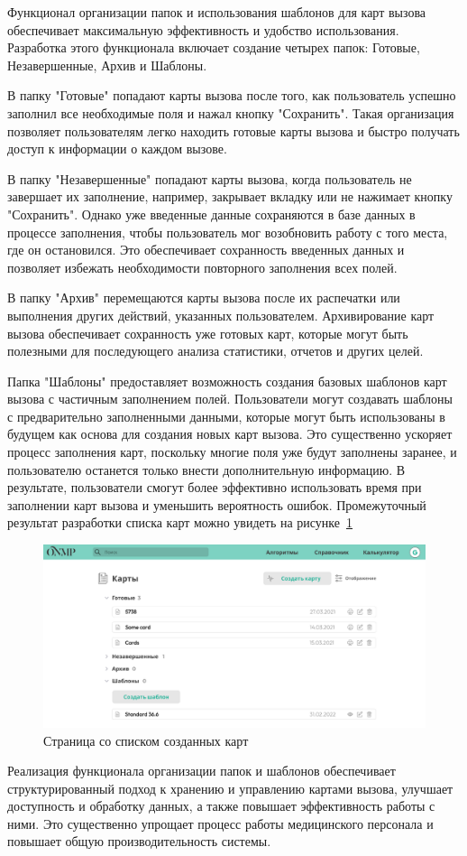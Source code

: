 Функционал организации папок и использования шаблонов для карт вызова обеспечивает максимальную эффективность и удобство использования. Разработка этого функционала включает создание четырех папок: Готовые, Незавершенные, Архив и Шаблоны.

В папку "Готовые" попадают карты вызова после того, как пользователь успешно заполнил все необходимые поля и нажал кнопку "Сохранить". Такая организация позволяет пользователям легко находить готовые карты вызова и быстро получать доступ к информации о каждом вызове.

В папку "Незавершенные" попадают карты вызова, когда пользователь не завершает их заполнение, например, закрывает вкладку или не нажимает кнопку "Сохранить". Однако уже введенные данные сохраняются в базе данных в процессе заполнения, чтобы пользователь мог возобновить работу с того места, где он остановился. Это обеспечивает сохранность введенных данных и позволяет избежать необходимости повторного заполнения всех полей.

В папку "Архив" перемещаются карты вызова после их распечатки или выполнения других действий, указанных пользователем. Архивирование карт вызова обеспечивает сохранность уже готовых карт, которые могут быть полезными для последующего анализа статистики, отчетов и других целей.

Папка "Шаблоны" предоставляет возможность создания базовых шаблонов карт вызова с частичным заполнением полей. Пользователи могут создавать шаблоны с предварительно заполненными данными, которые могут быть использованы в будущем как основа для создания новых карт вызова. Это существенно ускоряет процесс заполнения карт, поскольку многие поля уже будут заполнены заранее, и пользователю останется только внести дополнительную информацию. В результате, пользователи смогут более эффективно использовать время при заполнении карт вызова и уменьшить вероятность ошибок. Промежуточный результат разработки списка карт можно увидеть на рисунке~\ref{fig:result2}

\begin{figure}
  \includegraphics[scale=0.58]{styles/diploma/inc/result2.png}
  \caption{Страница со списком созданных карт}
  \label{fig:result2}
\end{figure}

Реализация функционала организации папок и шаблонов обеспечивает структурированный подход к хранению и управлению картами вызова, улучшает доступность и обработку данных, а также повышает эффективность работы с ними. Это существенно упрощает процесс работы медицинского персонала и повышает общую производительность системы.
